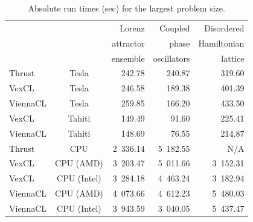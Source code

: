 \documentclass[final]{siamltex}
\begin{document}
% 
% 
% 
% 
% 
% 
% 

\begin{table}
 \centering
    \caption{Absolute run times (sec) for the largest problem size.}
    \label{tab:abstimes}
    \begin{tabular}{|lc|rrr|}
        \hline
        & & Lorenz    & Coupled     & Disordered  \\
        & & attractor & phase       & Hamiltonian \\
        & & ensemble  & oscillators & lattice     \\
        \hline
        Thrust   &Tesla & 242.78 & 240.87 & 319.60 \\
        VexCL    &Tesla & 246.58 & 189.38 & 401.39 \\
        ViennaCL &Tesla & 259.85 & 166.20 & 433.50 \\
        \hline
        VexCL    &Tahiti & 149.49 & 91.60 & 225.41 \\
        ViennaCL &Tahiti & 148.69 & 76.55 & 214.87 \\
        \hline
        Thrust   &CPU         & 2~336.14 & 5~182.55 & N/A \\
        VexCL    &CPU (AMD)   & 3~203.47 & 5~011.66 & 3~152.31 \\
        VexCL    &CPU (Intel) & 3~284.18 & 4~463.24 & 3~182.94 \\
        ViennaCL &CPU (AMD)   & 4~073.66 & 4~612.23 & 5~480.03 \\
        ViennaCL &CPU (Intel) & 3~943.59 & 3~040.05 & 5~437.47 \\
        \hline
    \end{tabular}
\end{table}
\end{document}
